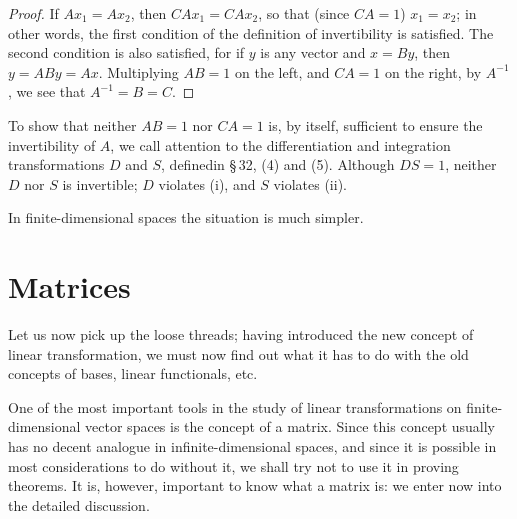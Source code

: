 \begin{proof}
    If \(Ax_1 = Ax_2\), then \(CAx_1 = CAx_2\), so that (since \(CA = 1\)) \(x_1 = x_2\); in other words, the first condition of the definition of invertibility is satisfied. The second condition is also satisfied, for if \(y\) is any vector and \(x = By\), then \(y = ABy = Ax\). Multiplying \(AB = 1\) on the left, and \(CA = 1\) on the right, by \(A^{-1}\), we see that \(A^{-1} = B = C\).
\end{proof}

To show that neither \(AB = 1\) nor \(CA = 1\) is, by itself, sufficient to
ensure the invertibility of \(A\), we call attention to the differentiation and
integration transformations \(D\) and \(S\), definedin §\,32, (4) and (5).
Although \(DS = 1\), neither \(D\) nor \(S\) is invertible; \(D\) violates (i),
and \(S\) violates (ii).

In finite-dimensional spaces the situation is much simpler.

\section{Matrices}

Let us now pick up the loose threads; having introduced the new concept of
linear transformation, we must now find out what it has to do with the old
concepts of bases, linear functionals, etc.

One of the most important tools in the study of linear transformations on
finite-dimensional vector spaces is the concept of a matrix. Since this concept
usually has no decent analogue in infinite-dimensional spaces, and since it is
possible in most considerations to do without it, we shall try not to use it in
proving theorems. It is, however, important to know what a matrix is: we enter
now into the detailed discussion.

